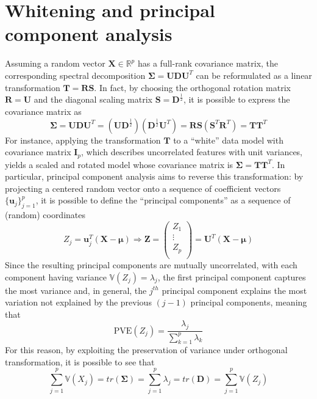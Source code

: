 \documentclass{report}
\begin{document}
\section{Whitening and principal component analysis}
Assuming a random vector $\displaystyle \mathbf{X} \in \mathbb{R}^p$ has a full-rank covariance matrix, the corresponding spectral decomposition $\displaystyle \mathbf{\Sigma} = \mathbf{UDU}^T$ can be reformulated as a linear transformation $\displaystyle \mathbf{T} = \mathbf{RS}$. \newline
In fact, by choosing the orthogonal rotation matrix $\displaystyle \mathbf{R} = \mathbf{U}$ and the diagonal scaling matrix $\displaystyle \mathbf{S} = \mathbf{D}^{\frac{1}{2}}$, it is possible to express the covariance matrix as
\[\mathbf{\Sigma} = \mathbf{UDU}^T = (\mathbf{UD}^{\frac{1}{2}})(\mathbf{D}^{\frac{1}{2}}\mathbf{U}^T) = \mathbf{RS}(\mathbf{S}^T\mathbf{R}^T) = \mathbf{TT}^T\]
For instance, applying the transformation $\displaystyle \mathbf{T}$ to a ``white'' data model with covariance matrix $\displaystyle \mathbf{I}_p$, which describes uncorrelated features with unit variances, yields a scaled and rotated model whose covariance matrix is $\displaystyle \mathbf{\Sigma} = \mathbf{TT}^T$. \newline
In particular, principal component analysis aims to reverse this transformation: by projecting a centered random vector onto a sequence of coefficient vectors $\displaystyle \{\mathbf{u}_j\}_{j = 1}^p$, it is possible to define the ``principal components'' as a sequence of (random) coordinates
\[Z_j = \mathbf{u}_j^T(\mathbf{X} - \mathbf{\mu}) \Rightarrow \mathbf{Z} = \begin{pmatrix}
    Z_1 \\
    \vdots \\
    Z_p \\
\end{pmatrix} = \mathbf{U}^T(\mathbf{X} - \mathbf{\mu})\]
Since the resulting principal components are mutually uncorrelated, with each component having variance $\displaystyle \mathbb{V}(Z_j) = \lambda_j$, the first principal component captures the most variance and, in general, the $\displaystyle j^{th}$ principal component explains the most variation not explained by the previous $\displaystyle (j - 1)$ principal components, meaning that
\[\text{PVE}(Z_j) = \frac{\lambda_j}{\sum_{k = 1}^p \lambda_k}\]
For this reason, by exploiting the preservation of variance under orthogonal transformation, it is possible to see that
\[\sum_{j = 1}^p \mathbb{V}(X_j) = tr(\mathbf{\Sigma}) = \sum_{j = 1}^p \lambda_j = tr(\mathbf{D}) = \sum_{j = 1}^p \mathbb{V}(Z_j)\]
\end{document}
